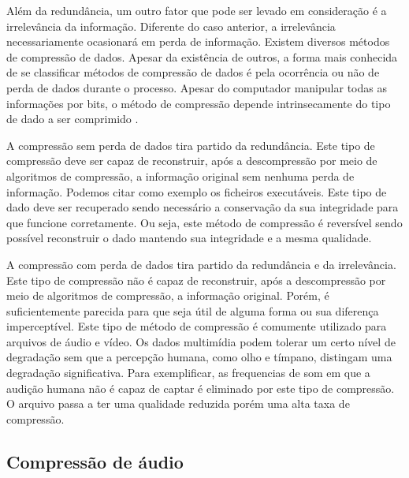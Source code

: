 Além da redundância, um outro fator que pode ser levado em consideração é a irrelevância da informação. Diferente do caso anterior, a irrelevância necessariamente ocasionará em perda de informação. Existem diversos métodos de compressão de dados. Apesar da existência de outros, a forma mais conhecida de se classificar métodos de compressão de dados é pela ocorrência ou não de perda de dados durante o processo. Apesar do computador manipular todas as informações por bits, o método de compressão depende intrinsecamente do tipo de dado a ser comprimido \cite{compressaoadaptativa}.


A compressão sem perda de dados tira partido da redundância. Este tipo de compressão deve ser capaz de reconstruir, após a descompressão por meio de algoritmos de compressão, a informação original sem nenhuma perda de informação. Podemos citar como exemplo os ficheiros executáveis. Este tipo de dado deve ser recuperado sendo necessário a conservação da sua integridade para que funcione corretamente. Ou seja, este método de compressão é reversível sendo possível reconstruir o dado mantendo sua integridade e a mesma qualidade.


A compressão com perda de dados tira partido da redundância e da irrelevância. Este tipo de compressão não é capaz de reconstruir, após a descompressão por meio de algoritmos de compressão, a informação original. Porém, é suficientemente parecida para que seja útil de alguma forma ou sua diferença imperceptível. Este tipo de método de compressão é comumente utilizado para arquivos de áudio e vídeo. Os dados multimídia podem tolerar um certo nível de degradação sem que a percepção humana, como olho e tímpano, distingam uma degradação significativa. Para exemplificar, as frequencias de som em que a audição humana não é capaz de captar é eliminado por este tipo de compressão. O arquivo passa a ter uma qualidade reduzida porém uma alta taxa de compressão.

\subsection{Compressão de áudio}


